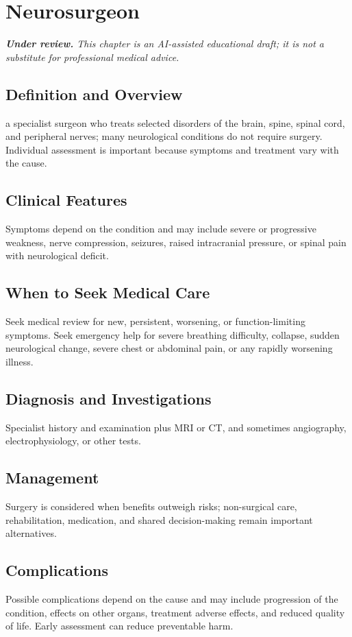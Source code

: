 \chapter{Neurosurgeon}

\medskip
\noindent\textit{\textbf{Under review.} This chapter is an AI-assisted educational draft; it is not a substitute for professional medical advice.}

\section*{Definition and Overview}
a specialist surgeon who treats selected disorders of the brain, spine, spinal cord, and peripheral nerves; many neurological conditions do not require surgery. Individual assessment is important because symptoms and treatment vary with the cause.

\section*{Clinical Features}
Symptoms depend on the condition and may include severe or progressive weakness, nerve compression, seizures, raised intracranial pressure, or spinal pain with neurological deficit.

\section*{When to Seek Medical Care}
Seek medical review for new, persistent, worsening, or function-limiting symptoms. Seek emergency help for severe breathing difficulty, collapse, sudden neurological change, severe chest or abdominal pain, or any rapidly worsening illness.

\section*{Diagnosis and Investigations}
Specialist history and examination plus MRI or CT, and sometimes angiography, electrophysiology, or other tests.

\section*{Management}
Surgery is considered when benefits outweigh risks; non-surgical care, rehabilitation, medication, and shared decision-making remain important alternatives.

\section*{Complications}
Possible complications depend on the cause and may include progression of the condition, effects on other organs, treatment adverse effects, and reduced quality of life. Early assessment can reduce preventable harm.

